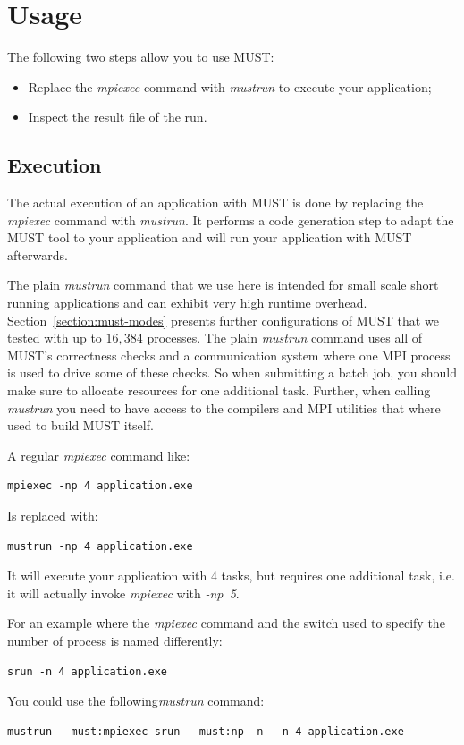 \documentclass[english]{scrartcl}
\begin{document}
\section{Usage}

The following two steps allow you to use MUST:
\begin{itemize}
\item Replace the \emph{mpiexec} command with
\emph{mustrun} to execute your application;
\item Inspect the result file of the run.
\end{itemize}

\subsection{Execution}

The actual execution of an application with MUST is done by replacing the
\emph{mpiexec} command with \emph{mustrun}. It performs a code generation step
to adapt the MUST tool to your application and will run your application with
MUST afterwards. 

The plain \emph{mustrun} command that we use here is intended for small scale
short running applications and can exhibit very high runtime overhead.
Section~\ref{section:must-modes} presents further configurations of MUST that
we tested with up to $16,384$ processes.  The plain \emph{mustrun} command uses
all of MUST's correctness checks and a communication system where one MPI 
process is used to drive some of these
checks. So when submitting a batch job,
you should make sure to allocate resources for one additional task. Further,
when calling \emph{mustrun} you need to have access to the compilers and MPI
utilities that where used to build MUST itself.

A regular \emph{mpiexec} command like:
\begin{verbatim}
mpiexec -np 4 application.exe
\end{verbatim}
Is replaced with:
\begin{verbatim}
mustrun -np 4 application.exe
\end{verbatim}
It will execute your application with 4 tasks, but requires one additional task,
i.e. it will actually invoke \emph{mpiexec} with \emph{\mbox{-np 5}}.

For an example where the \emph{mpiexec} command and the switch used to
specify the number of process is named differently:
\begin{verbatim}
srun -n 4 application.exe
\end{verbatim}
You could use the following\emph{mustrun} command:
\begin{verbatim}
mustrun --must:mpiexec srun --must:np -n  -n 4 application.exe
\end{verbatim}
\end{document}
